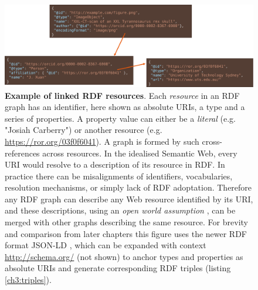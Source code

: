 \begin{figure}[hbt!]
  \includegraphics[width=\textwidth]{figures/ch03/jsonld.pdf}
    \caption[Example of linked RDF resources]{\textbf{Example of linked RDF resources}. Each \emph{resource} in an RDF graph has an identifier, here shown as absolute URIs, a type and a series of properties. A property value can either be a \emph{literal} (e.g. "Josiah Carberry") or another resource (e.g. \url{https://ror.org/03f0f6041}). A graph is formed by such cross-references across resources.
    In the idealised Semantic Web, every URI would resolve to a description of its resource in RDF. In practice there can be misalignments of identifiers, vocabularies, resolution mechanisms, or simply lack of RDF adoptation. Therefore any RDF graph can describe any Web resource identified by its URI, and these descriptions, using an \emph{open world assumption} \cite{Drummond 2006}, can be merged with other graphs describing the same resource.
    For brevity and comparison from later chapters this figure uses the newer RDF format JSON-LD \cite{w3-json-ld}, 
    which can be expanded with context \url{http://schema.org/} (not shown) to anchor types and 
    properties as absolute URIs and generate corresponding RDF triples (listing \vref{ch3:triples}). 
    }
  \label{ch3:fig:jsonld}
\end{figure}

